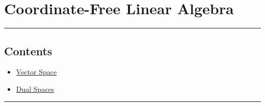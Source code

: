 \documentclass{article}
\begin{document}
\section*{Coordinate-Free Linear Algebra}

\bigskip
\noindent\rule{\textwidth}{1pt}
\bigskip

\subsection*{Contents}

\begin{itemize}
\item \href{ch01/index.html}{Vector Space}
\item \href{ch02/index.html}{Dual Spaces}
\end{itemize}

\bigskip
\noindent\rule{\textwidth}{1pt}
\end{document}
